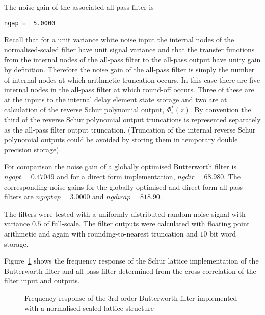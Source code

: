 \documentclass[a4paper,twoside,10pt,english]{report}
\begin{document}
The noise gain of the associated all-pass filter is
\begin{small}
\begin{verbatim}
ngap =  5.0000
\end{verbatim}
\end{small}
Recall that for a unit variance white noise input the internal nodes
of the normalised-scaled filter have unit signal variance and that
the transfer functions from the internal nodes of the all-pass filter
to the all-pass output have unity gain by definition. Therefore the
noise gain of the all-pass filter is simply the number of internal
nodes at which arithmetic truncation occurs. In this case there are
five internal nodes in the all-pass filter at which round-off occurs.
Three of these are at the inputs to the internal delay element state
storage and two are at calculation of the reverse Schur polynomial
output, $\Phi_{i}^{*}\left(z\right)$. By convention the third of
the reverse Schur polynomial output truncations is represented separately
as the all-pass filter output truncation. (Truncation of the internal
reverse Schur polynomial outputs could be avoided by storing them
in temporary double precision storage). 

For comparison the noise gain of a globally optimised Butterworth filter
is $ngopt=0.47049$ and for a direct form implementation, $ngdir=68.980$.
The corresponding noise gains for the globally optimised and direct-form
all-pass filters are $ngoptap=3.0000$ and $ngdirap=818.90$.

The filters were tested with a uniformly distributed random noise
signal with variance $0.5$ of full-scale. The filter outputs were
calculated with floating point arithmetic and again with rounding-to-nearest
truncation and $10$ bit word storage. 

Figure~\ref{fig:Freq-response-butt3NS} shows the frequency response of the 
Schur lattice implementation of the Butterworth filter and all-pass filter 
determined from the cross-correlation of the filter input and outputs.
\begin{figure}[!htbp]
\begin{center}
\scalebox{0.7}{}
\caption{Frequency response of the 3rd order Butterworth filter implemented with a normalised-scaled lattice structure}
\label{fig:Freq-response-butt3NS}
\end{center}
\end{figure}
\end{document}
